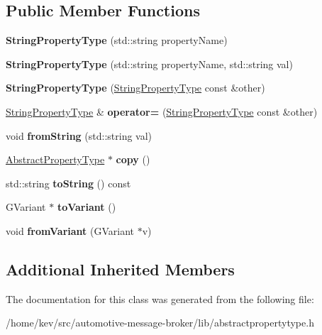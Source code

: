 \subsection*{Public Member Functions}
\begin{DoxyCompactItemize}
\item 
\hypertarget{classStringPropertyType_ac9474db13442001b615cb29b889844eb}{{\bfseries String\-Property\-Type} (std\-::string property\-Name)}\label{classStringPropertyType_ac9474db13442001b615cb29b889844eb}

\item 
\hypertarget{classStringPropertyType_a071f749092ee76790fb508f0ea8c974a}{{\bfseries String\-Property\-Type} (std\-::string property\-Name, std\-::string val)}\label{classStringPropertyType_a071f749092ee76790fb508f0ea8c974a}

\item 
\hypertarget{classStringPropertyType_a221e152eec4bfa2bab6e063dd7eb2108}{{\bfseries String\-Property\-Type} (\hyperlink{classStringPropertyType}{String\-Property\-Type} const \&other)}\label{classStringPropertyType_a221e152eec4bfa2bab6e063dd7eb2108}

\item 
\hypertarget{classStringPropertyType_a2eb25280c4494ff5f9aca137bf5040c7}{\hyperlink{classStringPropertyType}{String\-Property\-Type} \& {\bfseries operator=} (\hyperlink{classStringPropertyType}{String\-Property\-Type} const \&other)}\label{classStringPropertyType_a2eb25280c4494ff5f9aca137bf5040c7}

\item 
\hypertarget{classStringPropertyType_ad9dd60fcfd9fd3ebaa578815c8d552fe}{void {\bfseries from\-String} (std\-::string val)}\label{classStringPropertyType_ad9dd60fcfd9fd3ebaa578815c8d552fe}

\item 
\hypertarget{classStringPropertyType_a15866eb8e3ee9e1be587740f64353d57}{\hyperlink{classAbstractPropertyType}{Abstract\-Property\-Type} $\ast$ {\bfseries copy} ()}\label{classStringPropertyType_a15866eb8e3ee9e1be587740f64353d57}

\item 
\hypertarget{classStringPropertyType_afb461a0a918e23e66880d0c8d2180b35}{std\-::string {\bfseries to\-String} () const }\label{classStringPropertyType_afb461a0a918e23e66880d0c8d2180b35}

\item 
\hypertarget{classStringPropertyType_a1ec1ba3797194880a1e7576bd3695a28}{G\-Variant $\ast$ {\bfseries to\-Variant} ()}\label{classStringPropertyType_a1ec1ba3797194880a1e7576bd3695a28}

\item 
\hypertarget{classStringPropertyType_ad4a1e7db1f6b381ab956eb70afd1509e}{void {\bfseries from\-Variant} (G\-Variant $\ast$v)}\label{classStringPropertyType_ad4a1e7db1f6b381ab956eb70afd1509e}

\end{DoxyCompactItemize}
\subsection*{Additional Inherited Members}


The documentation for this class was generated from the following file\-:\begin{DoxyCompactItemize}
\item 
/home/kev/src/automotive-\/message-\/broker/lib/abstractpropertytype.\-h\end{DoxyCompactItemize}

